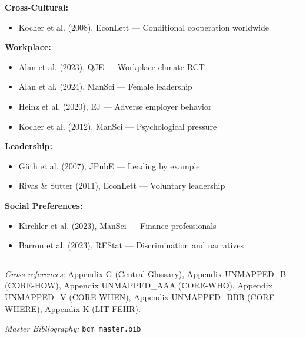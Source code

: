 \textbf{Cross-Cultural:}
\begin{itemize}[nosep]
\item Kocher et al. (2008), EconLett --- Conditional cooperation worldwide
\end{itemize}

\textbf{Workplace:}
\begin{itemize}[nosep]
\item Alan et al. (2023), QJE --- Workplace climate RCT
\item Alan et al. (2024), ManSci --- Female leadership
\item Heinz et al. (2020), EJ --- Adverse employer behavior
\item Kocher et al. (2012), ManSci --- Psychological pressure
\end{itemize}

\textbf{Leadership:}
\begin{itemize}[nosep]
\item G\"uth et al. (2007), JPubE --- Leading by example
\item Rivas \& Sutter (2011), EconLett --- Voluntary leadership
\end{itemize}

\textbf{Social Preferences:}
\begin{itemize}[nosep]
\item Kirchler et al. (2023), ManSci --- Finance professionals
\item Barron et al. (2023), REStat --- Discrimination and narratives
\end{itemize}

\nocite{bcm_master}



\vspace{1em}
\hrule
\vspace{0.5em}

\noindent\textit{Cross-references:}
Appendix G (Central Glossary),
Appendix UNMAPPED_B (CORE-HOW),
Appendix UNMAPPED_AAA (CORE-WHO),
Appendix UNMAPPED_V (CORE-WHEN),
Appendix UNMAPPED_BBB (CORE-WHERE),
Appendix K (LIT-FEHR).

\noindent\textit{Master Bibliography:} \texttt{bcm\_master.bib}

